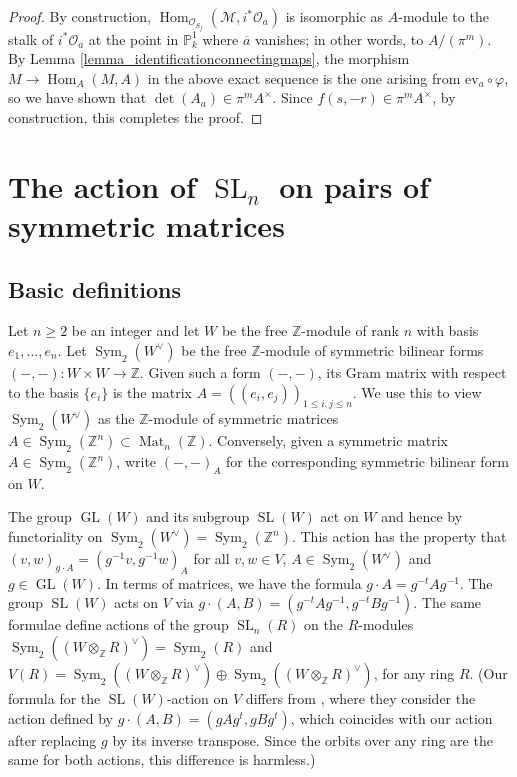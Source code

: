 \documentclass{article} %
\numberwithin{equation}{section}
\DeclareMathOperator{\GL}{GL}
\DeclareMathOperator{\SL}{SL}
\DeclareMathOperator{\Hom}{Hom}
\DeclareMathOperator{\Mat}{Mat}
\DeclareMathOperator{\Sym}{Sym}
\newcommand{\bbP}{\mathbb{P}}
\newcommand{\cO}{\mathcal{O}}
\newcommand{\cM}{\mathcal{M}}
\newcommand{\Z}{\mathbb{Z}}
\begin{document}
\begin{proof}
    By construction, $\Hom_{\cO_{S_f}}(\cM, i^\ast \cO_a)$ is isomorphic as $A$-module to the stalk of $i^\ast \cO_a$ at the point in $\bbP^1_k$ where $\overline{a}$ vanishes; in other words, to $A / (\pi^m)$. 
    By Lemma \ref{lemma_identificationconnectingmaps}, the morphism $M \to \Hom_A(M, A)$ in the above exact sequence is the one arising from $\mathrm{ev}_a \circ \varphi$, so we have shown that $\det(A_a) \in \pi^m A^\times$. Since $f(s, -r) \in \pi^m A^\times$, by construction, this completes the proof. 
\end{proof}

\section{The action of $\SL_n$ on pairs of symmetric matrices}\label{sec_the_representation}



\subsection{Basic definitions}\label{subsec_basicdefs}

Let $n\geq 2$ be an integer and let $W$ be the free $\Z$-module of rank $n$ with basis $e_1,\dots,e_n$.
Let $\Sym_2(W^{\vee})$ be the free $\Z$-module of symmetric bilinear forms $( -,-)\colon  W\times W\rightarrow \Z$.
Given such a form $(-,-)$, its Gram matrix with respect to the basis $\{e_i\}$ is the matrix $A = ((e_i,e_j))_{1\leq i,j\leq n}$. 
We use this to view $\Sym_2(W^{\vee})$ as the $\Z$-module of symmetric matrices $A\in \Sym_2(\Z^n)\subset\Mat_n(\Z)$.
Conversely, given a symmetric matrix $A\in \Sym_2(\Z^n)$, write $(-,-)_A$ for the corresponding symmetric bilinear form on $W$. 




The group $\GL(W)$ and its subgroup $\SL(W)$ act on $W$ and hence by functoriality on $\Sym_2(W^{\vee}) = \Sym_2(\Z^n)$.
This action has the property that $(v,w)_{g\cdot  A} = (g^{-1} v,g^{-1}w)_A$ for all $v,w\in V$, $A\in \Sym_2(W^{\vee})$ and $g\in \GL(W)$. In terms of matrices, we have the formula $g\cdot A = g^{-t} A g^{-1}$.
The group $\SL(W)$ acts on $V$ via $g\cdot (A,B) = (g^{-t} Ag^{-1}, g^{-t} B g^{-1})$. 
The same formulae define actions of the group $\SL_n(R)$ on the $R$-modules $\Sym_2((W\otimes_{\Z} R)^{\vee}) = \Sym_2(R)$ and $V(R) = \Sym_2((W\otimes_{\Z} R)^{\vee}) \oplus \Sym_2((W\otimes_{\Z} R)^{\vee})$, for any ring $R$.
(Our formula for the $\SL(W)$-action on $V$ differs from \cite{bhargava2015mosthyperellipticarepointless, BGW17}, where they consider the action defined by $g\cdot (A,B) = (gAg^t, gBg^t)$, which coincides with our action after replacing $g$ by its inverse transpose. 
Since the orbits over any ring are the same for both actions, this difference is harmless.)
\end{document}
